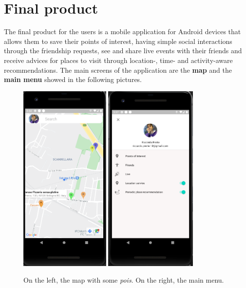 \documentclass[../main]{subfiles}
\begin{document}
\section{Final product}
\label{s:app}

The final product for the users is a mobile application for Android devices that allows them to save their points of interest, having simple social interactions 
through the friendship requests, see and share live events with their friends and receive advices for places to visit through location-, time- and activity-aware recommendations.
The main screens of the application are the \textbf{map} and the \textbf{main menu} showed in the following pictures.
\begin{figure}[H]
    \centering
    \includegraphics[width=0.4\textwidth]{images/app/app_overview}
    \includegraphics[width=0.41\textwidth]{images/app/main_menu}
    \caption{On the left, the map with some \textit{pois}. On the right, the main menu.}
\end{figure}






\end{document}
